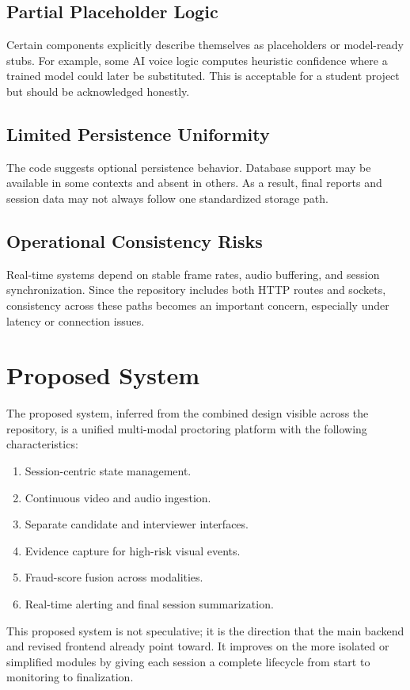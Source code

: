 \documentclass[12pt,a4paper]{extreport}
\begin{document}
\subsection{Partial Placeholder Logic}
Certain components explicitly describe themselves as placeholders or model-ready stubs. For example, some AI voice logic computes heuristic confidence where a trained model could later be substituted. This is acceptable for a student project but should be acknowledged honestly.

\subsection{Limited Persistence Uniformity}
The code suggests optional persistence behavior. Database support may be available in some contexts and absent in others. As a result, final reports and session data may not always follow one standardized storage path.

\subsection{Operational Consistency Risks}
Real-time systems depend on stable frame rates, audio buffering, and session synchronization. Since the repository includes both HTTP routes and sockets, consistency across these paths becomes an important concern, especially under latency or connection issues.

\section{Proposed System}
The proposed system, inferred from the combined design visible across the repository, is a unified multi-modal proctoring platform with the following characteristics:
\begin{enumerate}
  \item Session-centric state management.
  \item Continuous video and audio ingestion.
  \item Separate candidate and interviewer interfaces.
  \item Evidence capture for high-risk visual events.
  \item Fraud-score fusion across modalities.
  \item Real-time alerting and final session summarization.
\end{enumerate}

This proposed system is not speculative; it is the direction that the main backend and revised frontend already point toward. It improves on the more isolated or simplified modules by giving each session a complete lifecycle from start to monitoring to finalization.
\end{document}
